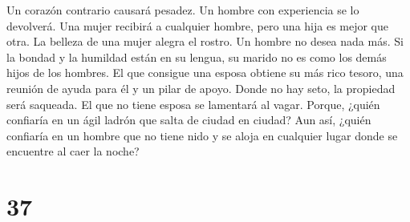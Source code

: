  Un corazón contrario causará pesadez. Un hombre con
experiencia se lo devolverá.  Una mujer recibirá a
cualquier hombre, pero una hija es mejor que otra.  La
belleza de una mujer alegra el rostro. Un hombre no desea nada más.
 Si la bondad y la humildad están en su lengua, su marido
no es como los demás hijos de los hombres.  El que
consigue una esposa obtiene su más rico tesoro, una reunión de ayuda
para él y un pilar de apoyo.  Donde no hay seto, la
propiedad será saqueada. El que no tiene esposa se lamentará al vagar.
 Porque, ¿quién confiaría en un ágil ladrón que salta de
ciudad en ciudad? Aun así, ¿quién confiaría en un hombre que no tiene
nido y se aloja en cualquier lugar donde se encuentre al caer la noche?

\hypertarget{section-36}{%
\section{37}\label{section-36}}

